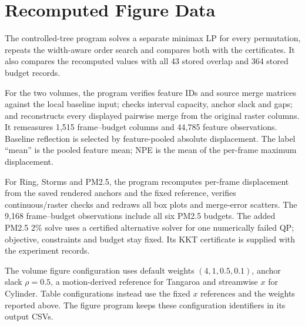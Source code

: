\documentclass[review]{vgtc}
\begin{document}



\section{Recomputed Figure Data}
The controlled-tree program solves a separate minimax LP for every permutation, repeats the width-aware order search and compares both with the certificates. It also compares the recomputed values with all 43 stored overlap and 364 stored budget records.

For the two volumes, the program verifies feature IDs and source merge matrices against the local baseline input; checks interval capacity, anchor slack and gaps; and reconstructs every displayed pairwise merge from the original raster columns. It remeasures 1,515 frame--budget columns and 44,785 feature observations. Baseline reflection is selected by feature-pooled absolute displacement. The label ``mean'' is the pooled feature mean; NPE is the mean of the per-frame maximum displacement.

For Ring, Storms and PM2.5, the program recomputes per-frame displacement from the saved rendered anchors and the fixed reference, verifies continuous/raster checks and redraws all box plots and merge-error scatters. The 9,168 frame--budget observations include all six PM2.5 budgets. The added PM2.5 2\% solve uses a certified alternative solver for one numerically failed QP; objective, constraints and budget stay fixed. Its KKT certificate is supplied with the experiment records.

The volume figure configuration uses default weights $(4,1,0.5,0.1)$, anchor slack $\rho=0.5$, a motion-derived reference for Tangaroa and streamwise $x$ for Cylinder. Table configurations instead use the fixed $x$ references and the weights reported above. The figure program keeps these configuration identifiers in its output CSVs.
\FloatBarrier\clearpage
\end{document}
